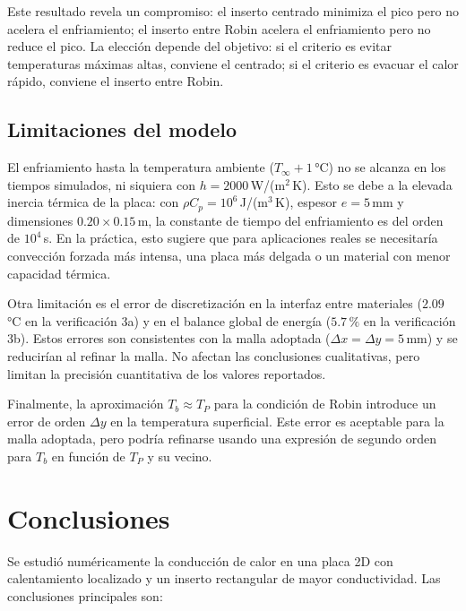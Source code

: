 \documentclass[11pt,a4paper]{article}
\begin{document}
Este resultado revela un compromiso: el inserto centrado minimiza el pico pero no acelera el enfriamiento; el inserto entre Robin acelera el enfriamiento pero no reduce el pico. La elección depende del objetivo: si el criterio es evitar temperaturas máximas altas, conviene el centrado; si el criterio es evacuar el calor rápido, conviene el inserto entre Robin.

\subsection{Limitaciones del modelo}

El enfriamiento hasta la temperatura ambiente ($T_\infty+1$\,°C) no se alcanza en los tiempos simulados, ni siquiera con $h=2000$\,W/(m$^2$\,K). Esto se debe a la elevada inercia térmica de la placa: con $\rho C_p=10^6$\,J/(m$^3$\,K), espesor $e=5$\,mm y dimensiones $0.20\times0.15$\,m, la constante de tiempo del enfriamiento es del orden de $10^4$\,s. En la práctica, esto sugiere que para aplicaciones reales se necesitaría convección forzada más intensa, una placa más delgada o un material con menor capacidad térmica.

Otra limitación es el error de discretización en la interfaz entre materiales ($2.09$\,°C en la verificación 3a) y en el balance global de energía ($5.7\,\%$ en la verificación 3b). Estos errores son consistentes con la malla adoptada ($\Delta x=\Delta y=5$\,mm) y se reducirían al refinar la malla. No afectan las conclusiones cualitativas, pero limitan la precisión cuantitativa de los valores reportados.

Finalmente, la aproximación $T_b\approx T_P$ para la condición de Robin introduce un error de orden $\Delta y$ en la temperatura superficial. Este error es aceptable para la malla adoptada, pero podría refinarse usando una expresión de segundo orden para $T_b$ en función de $T_P$ y su vecino.

\section{Conclusiones}

Se estudió numéricamente la conducción de calor en una placa 2D con calentamiento localizado y un inserto rectangular de mayor conductividad. Las conclusiones principales son:
\end{document}
